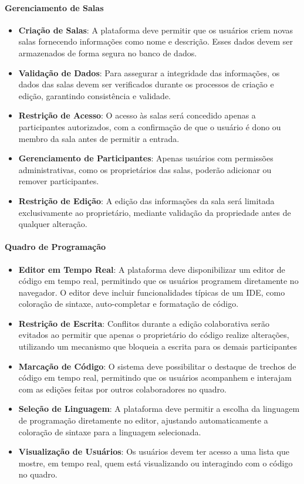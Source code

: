 \paragraph{Gerenciamento de Salas}

\begin{itemize}
    \item \textbf{Criação de Salas}: A plataforma deve permitir que os usuários criem novas salas fornecendo informações como nome e descrição. Esses dados devem ser armazenados de forma segura no banco de dados.
    \item \textbf{Validação de Dados}: Para assegurar a integridade das informações, os dados das salas devem ser verificados durante os processos de criação e edição, garantindo consistência e validade.
    \item \textbf{Restrição de Acesso}: O acesso às salas será concedido apenas a participantes autorizados, com a confirmação de que o usuário é dono ou membro da sala antes de permitir a entrada.
    \item \textbf{Gerenciamento de Participantes}: Apenas usuários com permissões administrativas, como os proprietários das salas, poderão adicionar ou remover participantes.
    \item \textbf{Restrição de Edição}: A edição das informações da sala será limitada exclusivamente ao proprietário, mediante validação da propriedade antes de qualquer alteração.
\end{itemize}

\paragraph{Quadro de Programação}

\begin{itemize}
    \item \textbf{Editor em Tempo Real}: A plataforma deve disponibilizar um editor de código em tempo real, permitindo que os usuários programem diretamente no navegador. O editor deve incluir funcionalidades típicas de um IDE, como coloração de sintaxe, auto-completar e formatação de código.
    \item \textbf{Restrição de Escrita}: Conflitos durante a edição colaborativa serão evitados ao permitir que apenas o proprietário do código realize alterações, utilizando um mecanismo que bloqueia a escrita para os demais participantes
    \item \textbf{Marcação de Código}: O sistema deve possibilitar o destaque de trechos de código em tempo real, permitindo que os usuários acompanhem e interajam com as edições feitas por outros colaboradores no quadro.
    \item \textbf{Seleção de Linguagem}: A plataforma deve permitir a escolha da linguagem de programação diretamente no editor, ajustando automaticamente a coloração de sintaxe para a linguagem selecionada.
    \item \textbf{Visualização de Usuários}: Os usuários devem ter acesso a uma lista que mostre, em tempo real, quem está visualizando ou interagindo com o código no quadro.
\end{itemize}

